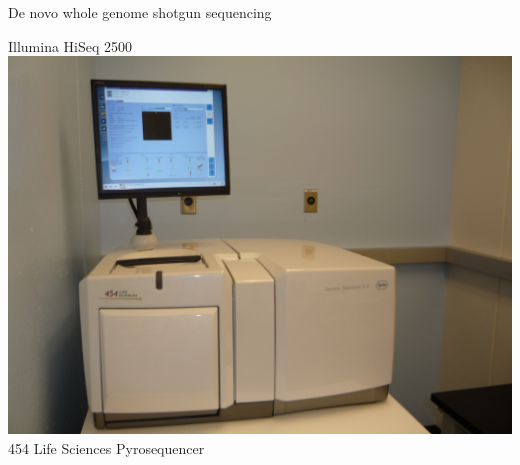 \documentclass[xcolor=dvipsnames]{beamer}
\begin{document}
\begin{frame}{De novo whole genome shotgun sequencing}
\begin{minipage}{0.32\textwidth}
\begin{center}
                Illumina HiSeq 2500 \\
            \vspace{0.2cm}
            \includegraphics[width=1.0\textwidth]{454_Sequencer.jpg} \\
                454 Life Sciences Pyrosequencer \\
        \end{center}
    \end{minipage}
\end{frame}
\end{document}
